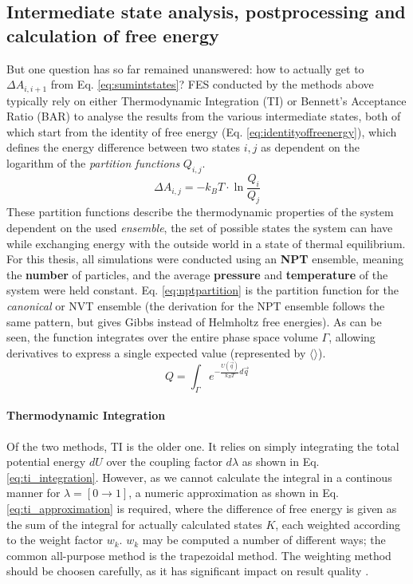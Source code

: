 \documentclass[oneside]{scrreprt}
\begin{document}
\subsection{Intermediate state analysis, postprocessing and calculation of free energy}

But one question has so far remained unanswered: how to actually get to $\Delta A_{i,i+1}$ from Eq. \ref{eq:sumintstates}? 
FES conducted by the methods above typically rely on either Thermodynamic Integration (TI) \cite{straatsma_free_1986} or Bennett's Acceptance Ratio (BAR) \cite{Bennett1976Oct,shirts_statistically_2008} to analyse the results from the various intermediate states, both of which start from the identity of free energy (Eq. \ref{eq:identityoffreenergy}), which defines the energy difference between two states $i,j$ as dependent on the logarithm of the \emph{partition functions} $Q_{i,j}$.
\begin{equation} \label{eq:identityoffreenergy}
    \Delta A_{i,j}=-k_{B}T\cdot \ln\frac{Q_i}{Q_j}
\end{equation}
These partition functions describe the thermodynamic properties of the system dependent on the used \emph{ensemble}, the set of possible states the system can have while exchanging energy with the outside world in a state of thermal equilibrium. For this thesis, all simulations were conducted using an \textbf{NPT} ensemble, meaning the \textbf{number} of particles, and the average \textbf{pressure} and \textbf{temperature} of the system were held constant. Eq. \ref{eq:nptpartition} is the partition function for the  \emph{canonical} or NVT ensemble (the derivation for the NPT ensemble follows the same pattern, but gives Gibbs instead of Helmholtz free energies). As can be seen, the function integrates over the entire phase space volume $\Gamma$, allowing derivatives to express a single expected value (represented by $\langle \rangle$).
\begin{equation} \label{eq:nptpartition}
    Q=\int_\Gamma e^{-\frac{U(\Vec{q})}{k_B T}d\Vec{q}}
\end{equation}

\paragraph{Thermodynamic Integration} Of the two methods, TI is  the older one. It relies on simply integrating the total potential energy $dU$ over the coupling factor $d\lambda$ as shown in Eq. \ref{eq:ti_integration}. However, as we cannot calculate the integral in a continous manner for $\lambda =[0\rightarrow1]$, a numeric approximation as shown in Eq. \ref{eq:ti_approximation} is required, where the difference of free energy is given as the sum of the integral for actually calculated states $K$, each weighted according to the weight factor $w_k$. $w_k$ may be computed a number of different ways; the common all-purpose method is the trapezoidal method. The weighting method should be choosen carefully, as it has significant impact on result quality \cite{boresch_efficiency_2011}.
\end{document}
